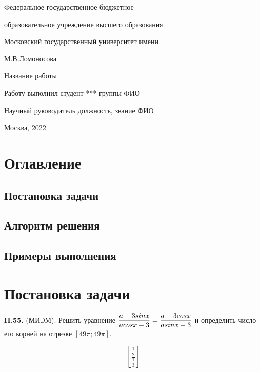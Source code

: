 \documentclass{article}
\begin{document}
\begin{titlepage}

\thispagestyle{empty}

\centerline{\LARGE{Федеральное государственное бюджетное}}
\vspace{10pt} \hspace{1pt}
\centerline{\Large{образовательное учреждение высшего образования}}
\centerline{\Large{Московский государственный университет имени}}
\centerline{\Large{М.В.Ломоносова}}

\vfill

\centerline{\huge{Название работы}}


\vfill

Работу выполнил \hfill студент *** группы ФИО

Научный руководитель \hfill должность, звание ФИО

\vfill

\centerline{Москва, 2022}
\clearpage
\end{titlepage} 

\section{Оглавление}

\subsection{Постановка задачи}

\subsection{Алгоритм решения}

\subsection{Примеры выполнения}

\section{Постановка задачи}
 
\textbf{II.55.} (МИЭМ). Решить уравнение $\displaystyle {{a - 3sinx}\over{acosx - 3}} = {{a - 3cosx}\over{asinx - 3}}$ и определить число его корней на отрезке $[49\pi; 49\pi]$.

\begin{equation*}
 \left[\frac{\frac{1}{2}}{\frac{1}{3}}\right]
\end{equation*}
\end{document}
